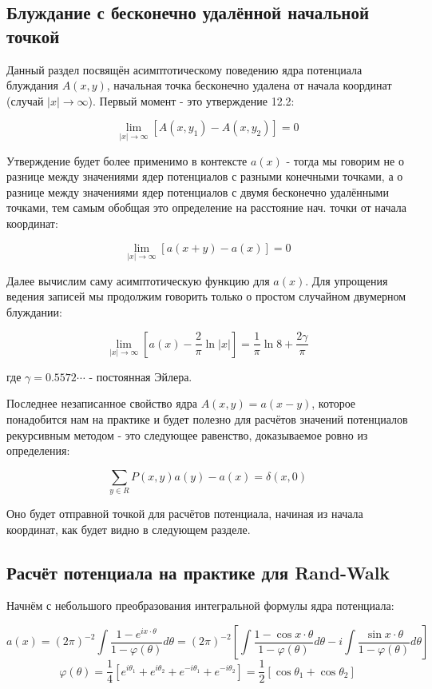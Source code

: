 \subsection{Блуждание с бесконечно удалённой начальной точкой}

Данный раздел посвящён асимптотическому поведению ядра потенциала блуждания $A(x,y)$, начальная точка бесконечно удалена от начала координат (случай $|x| \to \infty$).
Первый момент - это утверждение 12.2:

\[\lim_{|x| \to \infty}[A(x, y_1) - A(x, y_2)] = 0 \]

Утверждение будет более применимо в контексте $a(x)$ - тогда мы говорим не о разнице между значениями ядер потенциалов с разными конечными точками, а
о разнице между значениями ядер потенциалов с двумя бесконечно удалёнными точками, тем самым обобщая это определение на расстояние нач. точки от начала координат:

\[\lim_{|x| \to \infty}[a(x + y) - a(x)] = 0 \]

Далее вычислим саму асимптотическую функцию для $a(x)$. 
Для упрощения ведения записей мы продолжим говорить только о простом случайном двумерном блуждании:

\[ \lim_{|x| \to \infty}[a(x) - \frac{2}{\pi}\ln{|x|}] = \frac{1}{\pi}\ln{8} + \frac{2\gamma}{\pi} \]

где $\gamma = 0.5572\cdots$ - постоянная Эйлера.

Последнее незаписанное свойство ядра $A(x,y) = a(x-y)$, которое понадобится нам на практике и будет полезно для расчётов значений потенциалов рекурсивным 
методом - это следующее равенство, доказываемое ровно из определения:

\begin{equation}
 \sum_{y \in R} P(x,y)a(y) - a(x) = \delta(x,0) 
 \label{eq:13_3}
\end{equation}

Оно будет отправной точкой для расчётов потенциала, начиная из начала координат, как будет видно в следующем разделе. 

\subsection{Расчёт потенциала на практике для Rand-Walk}

Начнём с небольшого преобразования интегральной формулы ядра потенциала:

\[ a(x) = (2\pi)^{-2} \int \frac{1 - e^{i x\cdot \theta }}{1 - \varphi(\theta)}d\theta = (2\pi)^{-2} \left[\int \frac{1 - \cos{x\cdot \theta}}{1 - \varphi(\theta)}d\theta - i\int \frac{\sin{x\cdot \theta}}{1 - \varphi(\theta)}d\theta\right]\]
\[ \varphi(\theta) = \frac{1}{4} [e^{i\theta_1} + e^{i\theta_2} + e^{-i\theta_1} + e^{-i\theta_2}] = \frac{1}{2} [\cos{\theta_1} + \cos{\theta_2}]\]


